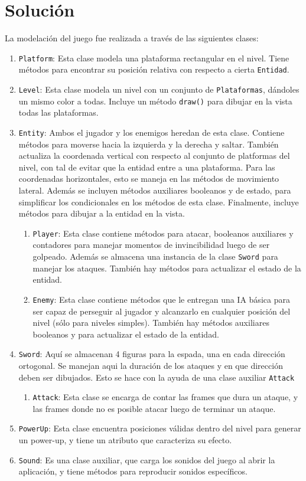 \documentclass[letterpaper,11pt]{article} %
\begin{document}
\section{Solución}
	La modelación del juego fue realizada a través de las siguientes clases:
	\renewcommand{\theenumii}{\roman{enumii}}
	\begin{enumerate}
		\item \verb!Platform!:
		Esta clase modela una plataforma rectangular en el nivel. Tiene métodos para encontrar su posición relativa con respecto a cierta \verb!Entidad!.
		\item \verb!Level!:
		Esta clase modela un nivel con un conjunto de \verb!Plataformas!, dándoles un mismo color a todas. Incluye un método \verb!draw()! para dibujar en la vista todas las plataformas.
		\item \verb!Entity!:
		Ambos el jugador y los enemigos heredan de esta clase. Contiene métodos para moverse hacia la izquierda y la derecha y saltar. También actualiza la coordenada vertical con respecto al conjunto de platformas del nivel, con tal de evitar que la entidad entre a una plataforma. Para las coordenadas horizontales, esto se maneja en las métodos de movimiento lateral. Además se incluyen métodos auxiliares booleanos y de estado, para simplificar los condicionales en los métodos de esta clase. Finalmente, incluye métodos para dibujar a la entidad en la vista.
		\begin{enumerate}
			\item \verb!Player!:
			Esta clase contiene métodos para atacar, booleanos auxiliares y contadores para manejar momentos de invincibilidad luego de ser golpeado. Además se almacena una instancia de la clase \verb!Sword! para manejar los ataques. También hay métodos para actualizar el estado de la entidad.
			\item \verb!Enemy!:
			Esta clase contiene métodos que le entregan una IA básica para ser capaz de perseguir al jugador y alcanzarlo en cualquier posición del nivel (sólo para niveles simples). También hay métodos auxiliares booleanos y para actualizar el estado de la entidad.
		\end{enumerate}
		\item \verb!Sword!:
		Aquí se almacenan 4 figuras para la espada, una en cada dirección ortogonal. Se manejan aqui la duración de los ataques y en que dirección deben ser dibujados. Esto se hace con la ayuda de una clase auxiliar \verb!Attack!
		\begin{enumerate}
			\item \verb!Attack!:
			Esta clase se encarga de contar las frames que dura un ataque, y las frames donde no es posible atacar luego de terminar un ataque.
		\end{enumerate}
		\item \verb!PowerUp!:
		Esta clase encuentra posiciones válidas dentro del nivel para generar un power-up, y tiene un atributo que caracteriza su efecto.
		\item \verb!Sound!:
		Es una clase auxiliar, que carga los sonidos del juego al abrir la aplicación, y tiene métodos para reproducir sonidos específicos.
	\end{enumerate}
	
\end{document}
